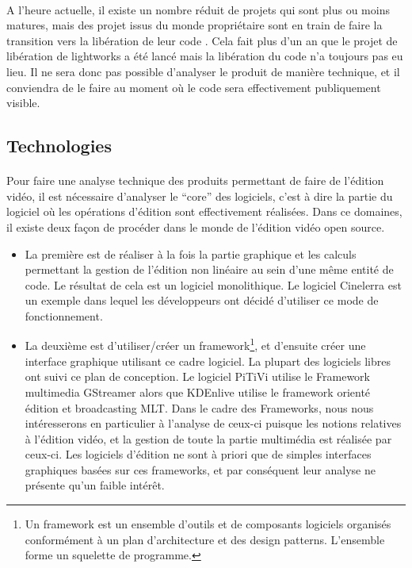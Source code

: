 \paragraph{}
A l'heure actuelle, il existe un nombre réduit de projets qui
sont plus ou moins matures, mais des projet issus du monde propriétaire
sont en train de faire la transition vers la libération de leur code
\cite{TheLightworksOpenSourceProjectStartHere}. Cela fait plus d'un an que
le projet de libération de lightworks a été lancé mais la libération
du code n'a toujours pas eu lieu. Il ne sera donc pas possible d'analyser
le produit de manière technique, et il conviendra de le faire au moment
où le code sera effectivement publiquement visible.

\subsection{Technologies} \paragraph{} Pour faire une analyse technique
des produits permettant de faire de l'édition vidéo, il est nécessaire
d'analyser le ``core'' des logiciels, c'est à dire la partie du
logiciel où les opérations d'édition sont effectivement réalisées. Dans
ce domaines, il existe deux façon de procéder dans le monde de l'édition
vidéo open source.

\begin{itemize}
  \item{La première est de réaliser à la fois la partie graphique et
    les calculs permettant la gestion de l'édition non linéaire au
    sein d'une même entité de code. Le résultat de cela est un logiciel
    monolithique. Le logiciel Cinelerra est un %
    exemple dans lequel les développeurs ont décidé d'utiliser ce
    mode de fonctionnement.}
  \item{La deuxième est d'utiliser/créer un framework\footnote{Un
    framework est un ensemble d'outils et de composants logiciels
    organisés conformément à un plan d'architecture et des design
    patterns. L'ensemble forme un squelette de programme.}, et d'ensuite
    créer une interface graphique utilisant ce cadre logiciel. La
    plupart des logiciels libres ont suivi ce plan de conception. Le
    logiciel PiTiVi utilise le Framework multimedia GStreamer alors que
    KDEnlive utilise le framework orienté édition et broadcasting
    MLT. Dans le cadre des Frameworks, nous nous intéresserons en
    particulier à l'analyse de ceux-ci puisque les notions relatives à
    l'édition vidéo, et la gestion de toute la partie multimédia est
    réalisée par ceux-ci. Les logiciels d'édition ne sont à priori
    que de simples interfaces graphiques basées sur ces frameworks,
    et par conséquent leur analyse ne présente qu'un faible intérêt.}
\end{itemize}

